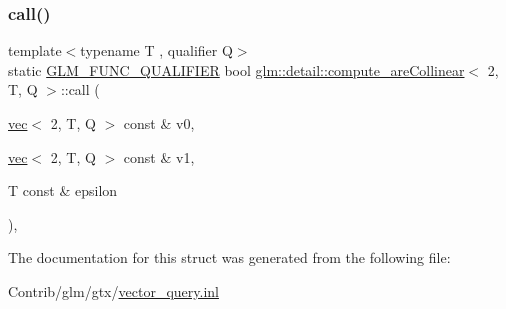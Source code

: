 \subsubsection{\texorpdfstring{call()}{call()}}
{\footnotesize\ttfamily template$<$typename T , qualifier Q$>$ \\
static \mbox{\hyperlink{setup_8hpp_a33fdea6f91c5f834105f7415e2a64407}{G\+L\+M\+\_\+\+F\+U\+N\+C\+\_\+\+Q\+U\+A\+L\+I\+F\+I\+ER}} bool \mbox{\hyperlink{structglm_1_1detail_1_1compute__are_collinear}{glm\+::detail\+::compute\+\_\+are\+Collinear}}$<$ 2, T, Q $>$\+::call (\begin{DoxyParamCaption}\item[{\mbox{\hyperlink{structglm_1_1vec}{vec}}$<$ 2, T, Q $>$ const \&}]{v0,  }\item[{\mbox{\hyperlink{structglm_1_1vec}{vec}}$<$ 2, T, Q $>$ const \&}]{v1,  }\item[{T const \&}]{epsilon }\end{DoxyParamCaption})\hspace{0.3cm}{\ttfamily [inline]}, {\ttfamily [static]}}



The documentation for this struct was generated from the following file\+:\begin{DoxyCompactItemize}
\item 
Contrib/glm/gtx/\mbox{\hyperlink{vector__query_8inl}{vector\+\_\+query.\+inl}}\end{DoxyCompactItemize}
